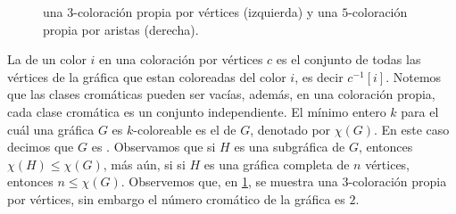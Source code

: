 \begin{figure}[ht!]
    \centering
    \caption{una $3$-coloraci\'on propia por v\'ertices (izquierda) y una 
        $5$-coloraci\'on propia por aristas (derecha).}
        \label{fig:ex-color-prop}
\end{figure}

La  de un color $i$ en una coloraci\'on por v\'ertices
$c$ es el conjunto de todas las v\'ertices de la gr\'afica que estan coloreadas
del color $i$, es decir $c^{-1}[i]$. Notemos que las clases crom\'aticas pueden
ser vac\'ias, adem\'as, en una coloraci\'on propia, cada clase crom\'atica es un
conjunto independiente. El m\'inimo entero $k$ para el cu\'al una gr\'afica $G$
es $k$-coloreable es el  de $G$, denotado por
$\chi(G)$. En este caso decimos que $G$ es
. Observamos que si $H$ es una
subgr\'afica de $G$, entonces $\chi(H) \leq \chi(G)$, m\'as a\'un, si si $H$ es
una gr\'afica completa de $n$ v\'ertices, entonces $n \leq \chi(G)$. Observemos
que, en \cref{fig:ex-color-prop}, se muestra una $3$-coloraci\'on propia por
v\'ertices, sin embargo el n\'umero crom\'atico de la gr\'afica es $2$.



